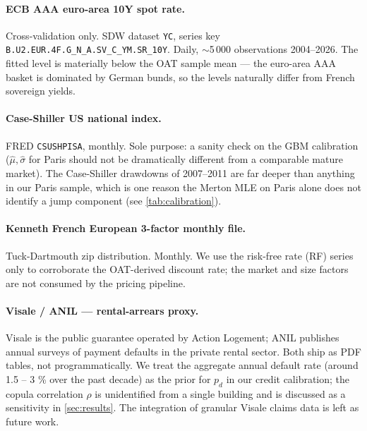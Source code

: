 \paragraph{ECB AAA euro-area 10Y spot rate.}
Cross-validation only. SDW dataset \texttt{YC}, series key
\texttt{B.U2.EUR.4F.G\_N\_A.SV\_C\_YM.SR\_10Y}. Daily, $\sim$5\,000
observations 2004–2026. The fitted level is materially below the OAT
sample mean — the euro-area AAA basket is dominated by German bunds, so
the levels naturally differ from French sovereign yields.

\paragraph{Case-Shiller US national index.}
FRED \texttt{CSUSHPISA}, monthly. Sole purpose: a sanity check on the GBM
calibration ($\hat\mu, \hat\sigma$ for Paris should not be dramatically
different from a comparable mature market). The Case-Shiller drawdowns of
2007–2011 are far deeper than anything in our Paris sample, which is one
reason the Merton MLE on Paris alone does not identify a jump component
(see \cref{tab:calibration}).

\paragraph{Kenneth French European 3-factor monthly file.}
Tuck-Dartmouth zip distribution. Monthly. We use the risk-free rate (RF)
series only to corroborate the OAT-derived discount rate; the market and
size factors are not consumed by the pricing pipeline.

\paragraph{Visale / ANIL — rental-arrears proxy.}
Visale is the public guarantee operated by Action Logement; ANIL
publishes annual surveys of payment defaults in the private rental
sector. Both ship as PDF tables, not programmatically. We treat the
aggregate annual default rate (around 1.5 – 3 \% over the past decade)
as the prior for $p_d$ in our credit calibration; the copula correlation
$\rho$ is unidentified from a single building and is discussed as a
sensitivity in \cref{sec:results}. The integration of
granular Visale claims data is left as future work.
